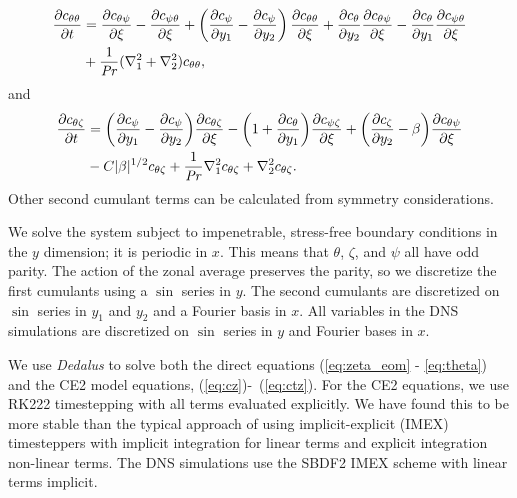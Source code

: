 \documentclass{jfm}
\newcommand{\cz}{c_{\zeta}}
\newcommand{\cs}{c_{\psi}}
\newcommand{\ct}{c_{\theta}}
\newcommand{\csz}{c_{\psi \zeta}}
\newcommand{\ctz}{c_{\theta \zeta}}
\newcommand{\czt}{c_{\zeta \theta}}
\newcommand{\ctt}{c_{\theta \theta}}
\newcommand{\cst}{c_{\psi \theta}}
\newcommand{\cts}{c_{\theta \psi}}
\begin{document}
\begin{equation}
  \label{eq:ctt}
\begin{split}
  \pdv{\ctt}{t} &= \pdv{\cts}{\xi} - \pdv{\cst}{\xi} + \left(\pdv{\cs}{y_1} - \pdv{\cs}{y_2}\right)\pdv{\ctt}{\xi} + \pdv{\ct}{y_2}\pdv{\cts}{\xi} - \pdv{\ct}{y_1}\pdv{\cst}{\xi}\\
&  + \frac{1}{\Pran}(\nabla_1^2 + \nabla_2^2) \ctt,
\end{split}
\end{equation}
and
\begin{equation}
  \label{eq:ctz}
  \begin{split}
    \pdv{\ctz}{t} &= \qty(\pdv{\cs}{y_1} - \pdv{\cs}{y_2}) \pdv{\ctz}{\xi} - \qty(1 + \pdv{\ct}{y_1}) \pdv{\csz}{\xi} + \qty(\pdv{\cz}{y_2} - \beta) \pdv{\cts}{\xi}\\
    &  - C |\beta|^{1/2} \ctz + \frac{1}{\Pran} \nabla_1^2 \ctz + \nabla_2^2 \ctz.
  \end{split}
\end{equation}
Other second cumulant terms can be calculated from symmetry considerations.

We solve the system subject to impenetrable, stress-free boundary conditions in the $y$ dimension; it is periodic in $x$. 
This means that $\theta$, $\zeta$, and $\psi$ all have odd parity.
The action of the zonal average preserves the parity, so we discretize the first cumulants using a $\sin$ series in $y$. 
The second cumulants are discretized on $\sin$ series in $y_1$ and $y_2$ and a Fourier basis in $x$.
All variables in the DNS simulations are discretized on $\sin$ series in $y$ and Fourier bases in $x$.

We use \emph{Dedalus} \citep{2020PhRvR...2b3068B} to solve both the direct equations (\ref{eq:zeta_eom} - \ref{eq:theta}) and the CE2 model equations, (\ref{eq:cz})-~(\ref{eq:ctz}).
For the CE2 equations, we use RK222 timestepping with all terms evaluated explicitly.
We have found this to be more stable than the typical approach of using implicit-explicit (IMEX) timesteppers with implicit integration for linear terms and explicit integration non-linear terms.
The DNS simulations use the SBDF2 IMEX scheme with linear terms implicit.
\end{document}
